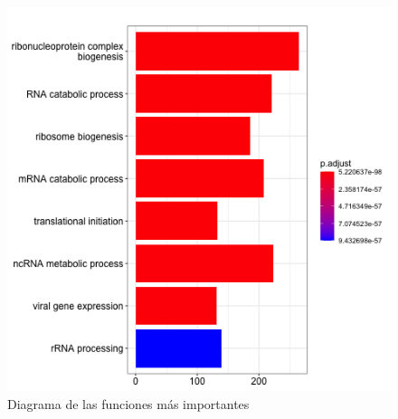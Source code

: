 \begin{figure}[ht!]
	\centering
	\includegraphics[scale = 0.3]{figures/barplotGenes2.png}
	\caption{Diagrama de las funciones m\'as importantes}
\end{figure}
\clearpage
